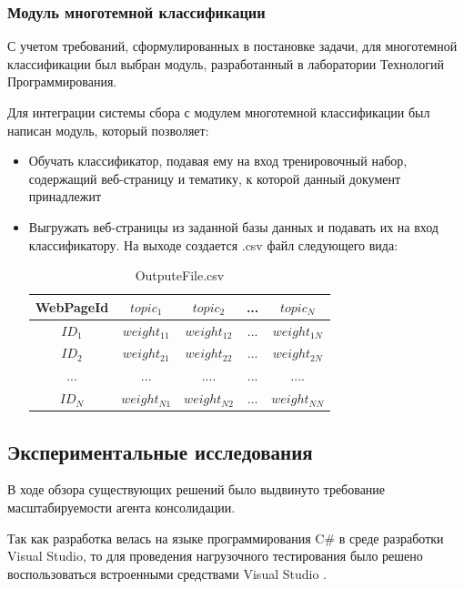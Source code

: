 \documentclass[russian, utf8, emptystyle]{eskdtext}
\begin{document}
\subsubsection{Модуль многотемной классификации}
С учетом требований, сформулированных в постановке задачи, для многотемной классификации был выбран модуль, разработанный в лаборатории Технологий Программирования.

Для интеграции системы сбора с модулем многотемной классификации был написан модуль, который позволяет:
\begin{itemize}
\item Обучать классификатор, подавая ему на вход тренировочный набор, содержащий веб-страницу и тематику, к которой данный документ принадлежит
\item Выгружать веб-страницы из заданной базы данных и подавать их на вход классификатору. На выходе создается .csv файл следующего вида: 
\begin{table} [h]
	\caption{OutputeFile.csv}
	\label{tab:far}
	\begin{center}
		\begin{tabular}{|c|c|c|c|c|}
			\hline
			WebPageId & \(topic_1\) & \(topic_2\) & ... & \(topic_N\)  \\
			\hline     
			\(ID_1\)  & \(weight_{11}\) & \(weight_{12}\) & ... & \(weight_{1N}\) \\
			\hline
			\(ID_2\)  & \(weight_{21}\) & \(weight_{22}\) & ... & \(weight_{2N}\) \\
			\hline
			... & ... & .... & ... & .... \\
			\hline
			\(ID_N\)  & \(weight_{N1}\) & \(weight_{N2}\) & ... & \(weight_{NN}\) \\
			\hline
		\end{tabular}
	\end{center}
\end{table}
\end{itemize}
\subsection{Экспериментальные исследования}
В ходе обзора существующих решений было выдвинуто требование масштабируемости агента консолидации.

	
Так как разработка велась на языке программирования C\# в среде разработки Visual Studio, то для проведения нагрузочного тестирования было решено воспользоваться встроенными средствами Visual Studio \cite{test}.
\end{document}
